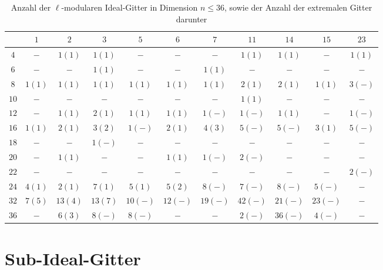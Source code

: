 \documentclass[12pt,a4paper,halfparskip,headsepline,bibtotocnumbered]{scrreprt}
\theoremstyle{nummermitklammern}
\theoremstyle{nonumberbreak}
\begin{document}
\begin{table}\label{tab:numidlat}
	\centering
	\begin{tabular}{|c||c|c|c|c|c|c|c|c|c|c|}
		\hline
		\backslashbox{$n$}{$\ell$}	&$1$	&$2$	&$3$	&$5$	&$6$	&$7$	&$11$	&$14$	&$15$	&$23$\\ \hline \hline
		$4$		&$-$		&$1(1)$		&$1(1)$		&$-$		&$-$		&$-$		&$1(1)$		&$1(1)$		&$-$		&$1(1)$ \\ \hline
		$6$		&$-$		&$-$		&$1(1)$		&$-$		&$-$		&$1(1)$		&$-$		&$-$		&$-$		&$-$ \\ \hline
		$8$		&$1(1)$		&$1(1)$		&$1(1)$		&$1(1)$		&$1(1)$		&$1(1)$		&$2(1)$		&$2(1)$		&$1(1)$		&$3(-)$ \\ \hline
		$10$	&$-$		&$-$		&$-$		&$-$		&$-$		&$-$		&$1(1)$		&$-$		&$-$		&$-$ \\ \hline
		$12$	&$-$		&$1(1)$		&$2(1)$		&$1(1)$		&$1(1)$		&$1(-)$		&$1(-)$		&$1(1)$		&$-$		&$1(-)$ \\ \hline
		$16$	&$1(1)$		&$2(1)$		&$3(2)$		&$1(-)$		&$2(1)$		&$4(3)$		&$5(-)$		&$5(-)$		&$3(1)$		&$5(-)$ \\ \hline
		$18$	&$-$		&$-$		&$1(-)$		&$-$		&$-$		&$-$		&$-$		&$-$		&$-$		&$-$ \\ \hline
		$20$	&$-$		&$1(1)$		&$-$		&$-$		&$1(1)$		&$1(-)$		&$2(-)$		&$-$		&$-$		&$-$ \\ \hline
		$22$	&$-$		&$-$		&$-$		&$-$		&$-$		&$-$		&$-$		&$-$		&$-$		&$2(-)$ \\ \hline
		$24$	&$4(1)$		&$2(1)$		&$7(1)$		&$5(1)$		&$5(2)$		&$8(-)$		&$7(-)$		&$8(-)$		&$5(-)$		&$-$ \\ \hline
		$32$	&$7(5)$		&$13(4)$	&$13(7)$	&$10(-)$	&$12(-)$	&$19(-)$	&$42(-)$	&$21(-)$	&$23(-)$	&$-$ \\ \hline
		$36$	&$-$		&$6(3)$		&$8(-)$		&$8(-)$		&$-$		&$-$		&$2(-)$		&$36(-)$	&$4(-)$		&$-$ \\ \hline
	\end{tabular}
	\caption{Anzahl der $\ell$-modularen Ideal-Gitter in Dimension $n \leq 36$, sowie der Anzahl der extremalen Gitter darunter}
\end{table}

\chapter{Sub-Ideal-Gitter}
\end{document}
